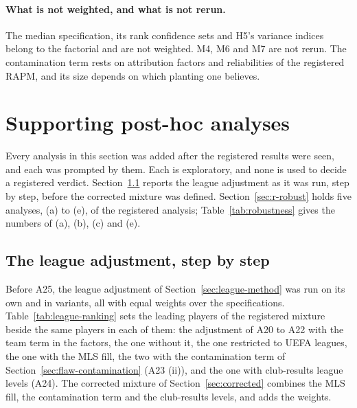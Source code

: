 \documentclass[11pt,a4paper]{article}
\begin{document}
\paragraph{What is not weighted, and what is not rerun.}
The median specification, its rank confidence sets and H5's variance indices
belong to the factorial and are not weighted. M4, M6 and M7 are not rerun.
The contamination term rests on attribution factors and reliabilities of the
registered RAPM, and its size depends on which planting one believes.

\section{Supporting post-hoc analyses}
\label{sec:r-posthoc}

Every analysis in this section was added after the registered results were
seen, and each was prompted by them. Each is exploratory, and none is used to
decide a registered verdict. Section~\ref{sec:league-ranking} reports the
league adjustment as it was run, step by step, before the corrected mixture
was defined. Section~\ref{sec:r-robust} holds five analyses, (a) to (e), of
the registered analysis; Table~\ref{tab:robustness} gives the numbers of (a),
(b), (c) and (e).

\subsection{The league adjustment, step by step}
\label{sec:league-ranking}

Before A25, the league adjustment of Section~\ref{sec:league-method} was run
on its own and in variants, all with equal weights over the specifications.
Table~\ref{tab:league-ranking} sets the leading players of the registered
mixture beside the same players in each of them: the adjustment of A20 to A22
with the team term in the factors, the one without it, the one restricted to
UEFA leagues, the one with the MLS fill, the two with the contamination term
of Section~\ref{sec:flaw-contamination} (A23 (ii)), and the one with
club-results league levels (A24). The corrected mixture of
Section~\ref{sec:corrected} combines the MLS fill, the contamination term and
the club-results levels, and adds the weights.
\end{document}
